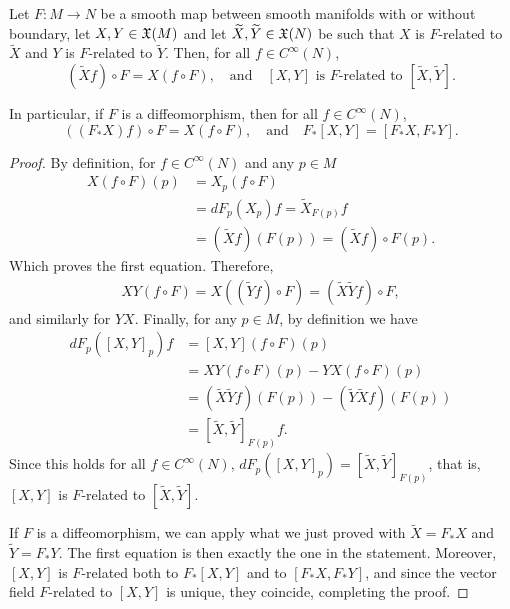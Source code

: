 \begin{theorem}\label{thm:liealgiso}
	Let $F:M\to N$ be a smooth map between smooth manifolds with or without boundary, let $X, Y \in\mathfrak{X}(M)$ and let $\widetilde X, \widetilde Y \in\mathfrak{X}(N)$ be such that $X$ is $F$-related to $\widetilde X$ and $Y$ is $F$-related to $\widetilde Y$. Then, for all $f\in C^\infty(N)$,
	\begin{equation}
		(\widetilde X f)\circ F = X(f\circ F), \quad\mbox{and}\quad
		[X,Y] \mbox{ is $F$-related to } [\widetilde X, \widetilde Y].
	\end{equation}

	In particular, if $F$ is a diffeomorphism, then for all $f\in C^\infty(N)$,
	\begin{equation}
		\left((F_* X)f\right)\circ F = X(f\circ F), \quad\mbox{and}\quad
		F_* [X,Y] = [F_* X, F_* Y].
	\end{equation}
\end{theorem}
\begin{proof}
	By definition, for $f\in C^\infty(N)$ and any $p\in M$
	\begin{align}
		X(f\circ F)(p) & = X_p(f\circ F)                                   \\
		               & = dF_p(X_p)f = \widetilde X_{F(p)}f               \\
		               & = (\widetilde X f)(F(p)) = (\widetilde X f)\circ F(p).
	\end{align}
	Which proves the first equation.
	Therefore,
	\begin{align}
		X Y (f\circ F) = X ((\widetilde Y f) \circ F)
		= (\widetilde X \widetilde Y f) \circ F,
	\end{align}
	and similarly for $Y X$.
	Finally, for any $p\in M$, by definition we have
	\begin{align}
		dF_p([X,Y]_p) f
		 & = [X,Y](f\circ F)(p)                                                   \\
		 & = XY (f\circ F)(p) - YX (f\circ F)(p)                                  \\
		 & = (\widetilde X \widetilde Y f)(F(p)) - (\widetilde Y \widetilde X f)(F(p)) \\
		 & = [\widetilde X, \widetilde Y]_{F(p)} f.
	\end{align}
	Since this holds for all $f\in C^\infty(N)$, $dF_p([X,Y]_p) = [\widetilde X, \widetilde Y]_{F(p)}$, that is, $[X,Y]$ is $F$-related to $[\widetilde X, \widetilde Y]$.

	If $F$ is a diffeomorphism, we can apply what we just proved with $\widetilde X = F_*X$ and $\widetilde Y = F_*Y$.
	The first equation is then exactly the one in the statement.
	Moreover, $[X,Y]$ is $F$-related both to $F_*[X,Y]$ and to $[F_*X, F_*Y]$, and since the vector field $F$-related to $[X,Y]$ is unique, they coincide, completing the proof.
\end{proof}

